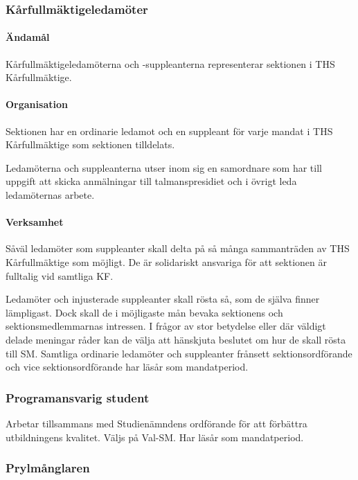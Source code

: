 \documentclass[a4paper,12pt]{article}
\begin{document}
\subsubsection{Kårfullmäktigeledamöter}

\paragraph{Ändamål}

Kårfullmäktigeledamöterna och -suppleanterna representerar sektionen i THS Kårfullmäktige.

\paragraph{Organisation}

Sektionen har en ordinarie ledamot och en suppleant för varje mandat i THS Kårfullmäktige som sektionen tilldelats.

Ledamöterna och suppleanterna utser inom sig en samordnare som har till uppgift att skicka anmälningar till talmanspresidiet och i övrigt leda ledamöternas arbete.

\paragraph{Verksamhet}

Såväl ledamöter som suppleanter skall delta på så många sammanträden av THS Kårfullmäktige som möjligt. De är solidariskt ansvariga för att sektionen är fulltalig vid samtliga KF.

Ledamöter och injusterade suppleanter skall rösta så, som de själva finner lämpligast. Dock skall de i möjligaste mån bevaka sektionens och sektionsmedlemmarnas intressen. I frågor av stor betydelse eller där väldigt delade meningar råder kan de välja att hänskjuta beslutet om hur de skall rösta till SM. Samtliga ordinarie ledamöter och suppleanter frånsett sektionsordförande och vice sektionsordförande har läsår som mandatperiod.

\subsubsection{Programansvarig student}

Arbetar tillsammans med Studienämndens ordförande för att förbättra utbildningens kvalitet. Väljs på Val-SM. Har läsår som mandatperiod.

\subsubsection{Prylmånglaren}
\end{document}
